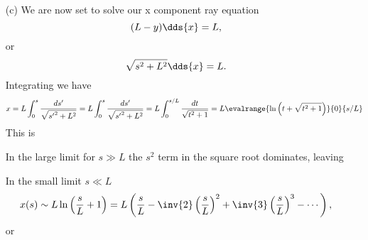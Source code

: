 {\begin{enumerate}
In the large limit for \(s \gg L\) the \(s^2\) term dominates, leaving


A plot of \(y/L\), \(-s/L\), and \(-s^2/2 L^2\) can be found in \cref{fig:modernOpticsProblemSet1:modernOpticsProblemSet1Fig2b} and \cref{fig:modernOpticsProblemSet1:modernOpticsProblemSet1Fig2bBig}.
%
%
\item[(c)]
We are now set to solve our x component ray equation
%
\begin{dmath}\label{eqn:modernOpticsProblemSet1P2:290}
(L - y) \dds{x} = L,
\end{dmath}
%
or
\begin{dmath}\label{eqn:modernOpticsProblemSet1P2:310}
\sqrt{s^2 + L^2} \dds{x} = L.
\end{dmath}
%
Integrating we have
%
\begin{dmath}\label{eqn:modernOpticsProblemSet1P2:330}
x
= L \int_0^s \frac{ds'}{\sqrt{{s'}^2 + L^2}}
= L \int_0^s \frac{ds'}{\sqrt{{s'}^2 + L^2}}
= L \int_0^{s/L} \frac{dt}{\sqrt{t^2 + 1}}
= L \evalrange{ \ln\left( t + \sqrt{ t^2 + 1} \right) }{0}{s/L}
\end{dmath}
%
This is


In the large limit for \(s \gg L\) the \(s^2\) term in the square root dominates, leaving


In the small limit \(s \ll L\)
%
\begin{dmath}\label{eqn:modernOpticsProblemSet1P2:390}
x(s) \sim L \ln\left( \frac{s}{L} + 1 \right)
= L \left(
\frac{s}{L}
 -\inv{2}
\left(
\frac{s}{L}
\right)^2
 +\inv{3}
\left(
\frac{s}{L}
\right)^3
- \cdots
\right),
\end{dmath}
%
or


\end{enumerate}}
